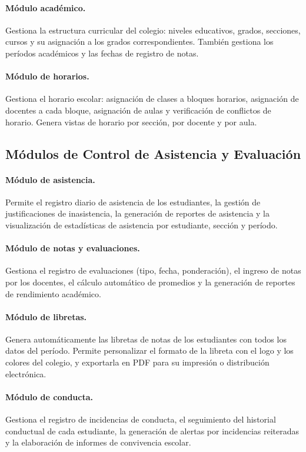 \documentclass[12pt,a4paper,oneside]{report}
\begin{document}
\paragraph{Módulo académico.} Gestiona la estructura curricular del colegio: niveles educativos, grados, secciones, cursos y su asignación a los grados correspondientes. También gestiona los períodos académicos y las fechas de registro de notas.

\paragraph{Módulo de horarios.} Gestiona el horario escolar: asignación de clases a bloques horarios, asignación de docentes a cada bloque, asignación de aulas y verificación de conflictos de horario. Genera vistas de horario por sección, por docente y por aula.

\subsection{Módulos de Control de Asistencia y Evaluación}

\paragraph{Módulo de asistencia.} Permite el registro diario de asistencia de los estudiantes, la gestión de justificaciones de inasistencia, la generación de reportes de asistencia y la visualización de estadísticas de asistencia por estudiante, sección y período.

\paragraph{Módulo de notas y evaluaciones.} Gestiona el registro de evaluaciones (tipo, fecha, ponderación), el ingreso de notas por los docentes, el cálculo automático de promedios y la generación de reportes de rendimiento académico.

\paragraph{Módulo de libretas.} Genera automáticamente las libretas de notas de los estudiantes con todos los datos del período. Permite personalizar el formato de la libreta con el logo y los colores del colegio, y exportarla en PDF para su impresión o distribución electrónica.

\paragraph{Módulo de conducta.} Gestiona el registro de incidencias de conducta, el seguimiento del historial conductual de cada estudiante, la generación de alertas por incidencias reiteradas y la elaboración de informes de convivencia escolar.
\end{document}
